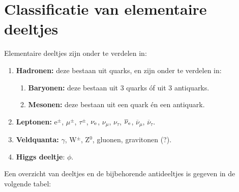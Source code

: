 \documentclass[twoside]{report}
\begin{document}
\section[~~Classificatie van elementaire deeltjes]{Classificatie van elementaire deeltjes}
Elementaire deeltjes zijn onder te verdelen in:
\begin{enumerate}
\setlength{\itemsep}{0mm}
\item {\bf Hadronen:} deze bestaan uit quarks, en zijn onder te verdelen in:
      \begin{enumerate}
      \setlength{\itemsep}{0mm}
      \item {\bf Baryonen:} deze bestaan uit 3 quarks \'of uit 3 antiquarks.
      \item {\bf Mesonen:} deze bestaan uit een quark \'en een antiquark.
      \end{enumerate}
\item {\bf Leptonen:} e$^\pm$, $\mu^\pm$, $\tau^\pm$, $\nu_{\rm e}$, $\nu_\mu$, $\nu_\tau$,
      $\overline{\nu}_{\rm e}$, $\overline{\nu}_\mu$, $\overline{\nu}_\tau$.
\item {\bf Veldquanta:} $\gamma$, W$^\pm$, Z$^0$, gluonen, gravitonen (?).
\item {\bf Higgs deeltje}: $\phi$.
\end{enumerate}
Een overzicht van deeltjes en de bijbehorende antideeltjes is gegeven in de
volgende tabel:
\end{document}
